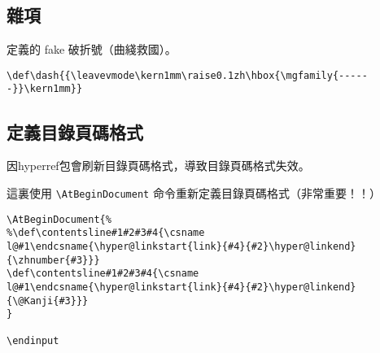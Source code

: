 \subsection{雜項}

\par 定義的 fake 破折號（曲綫救國）。
\begin{lstlisting}[firstnumber=1202]
\def\dash{{\leavevmode\kern1mm\raise0.1zh\hbox{\mgfamily{------}}\kern1mm}}
\end{lstlisting}



\subsection{定義目錄頁碼格式}
\par 因hyperref包會刷新目錄頁碼格式，導致目錄頁碼格式失效。
\par 這裏使用 \verb+\AtBeginDocument+ 命令重新定義目錄頁碼格式（非常重要！！）
\begin{lstlisting}[firstnumber=1205]
\AtBeginDocument{%
%\def\contentsline#1#2#3#4{\csname l@#1\endcsname{\hyper@linkstart{link}{#4}{#2}\hyper@linkend}{\zhnumber{#3}}}
\def\contentsline#1#2#3#4{\csname l@#1\endcsname{\hyper@linkstart{link}{#4}{#2}\hyper@linkend}{\@Kanji{#3}}}
}

\endinput
\end{lstlisting}


\endinput
